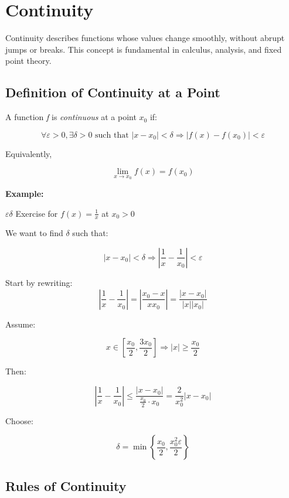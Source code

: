 \newpage
\section{Continuity}

Continuity describes functions whose values change smoothly, without abrupt jumps or breaks. 
This concept is fundamental in calculus, analysis, and fixed point theory.

\subsection{Definition of Continuity at a Point}

A function \emph{f} is \emph{continuous} at a point \(x_0\) if:

\[
    \forall \varepsilon > 0, \exists \delta > 0 \text{ such that } |x - x_0| < \delta \Rightarrow |f(x) - f(x_0)| < \varepsilon
\]

Equivalently,

\[
    \lim_{x \to x_0} f(x) = f(x_0)
\]

\textbf{Example:} 
\vspace{\baselineskip}

\(\varepsilon \delta\) Exercise for \(f(x) = \frac{1}{x}\) at \(x_0 > 0\)
\vspace{\baselineskip}

We want to find \(\delta\) such that:

\[
    |x - x_0| < \delta \Rightarrow \left|\frac{1}{x} - \frac{1}{x_0}\right| < \varepsilon
\]

Start by rewriting:
\[
    \left|\frac{1}{x} - \frac{1}{x_0}\right| = \left|\frac{x_0 - x}{xx_0}\right| = \frac{|x - x_0|}{|x||x_0|}
\]

Assume:

\[
    x \in \left[\frac{x_0}{2}, \frac{3x_0}{2}\right] \Rightarrow |x| \ge \frac{x_0}{2}
\]

Then:

\[
    \left|\frac{1}{x} - \frac{1}{x_0}\right| \le \frac{|x - x_0|}{\frac{x_0}{2} \cdot x_0} = \frac{2}{x_0^2} |x - x_0|
\]

Choose:

\[
    \delta = \min\left\{\frac{x_0}{2}, \frac{x_0^2 \varepsilon}{2} \right\}
\]

\subsection{Rules of Continuity}

